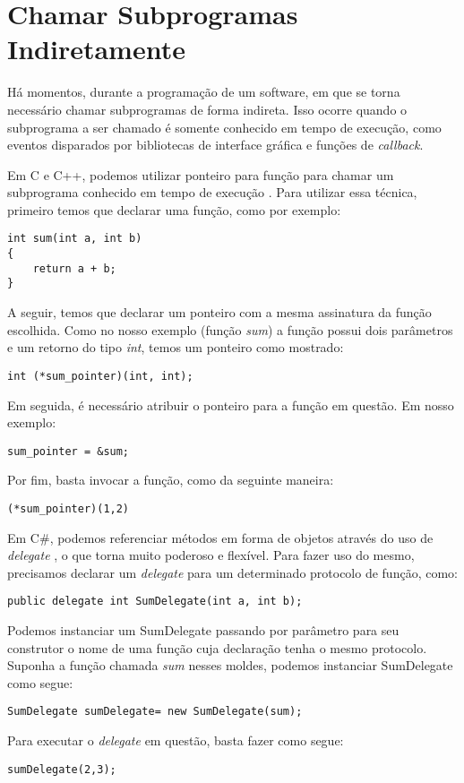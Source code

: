 \section{Chamar Subprogramas Indiretamente} %
\label{sec:chamar_subprogramas_indiretamente}
Há momentos, durante a programação de um software, em que se torna necessário chamar subprogramas de forma indireta. Isso ocorre quando o subprograma a ser chamado é somente conhecido em tempo de execução, como eventos disparados por bibliotecas de interface gráfica e funções de \textit{callback}.

Em C e C++, podemos utilizar ponteiro para função para chamar um subprograma conhecido em tempo de execução \cite{pointer,sebesta}. Para utilizar essa técnica, primeiro temos que declarar uma função, como por exemplo:
\begin{verbatim}
int sum(int a, int b)
{
    return a + b;
}
\end{verbatim}

A seguir, temos que declarar um ponteiro com a mesma assinatura da função escolhida. Como no nosso exemplo (função \textit{sum}) a função possui dois parâmetros e um retorno do tipo \emph{int}, temos um ponteiro como mostrado:
\begin{verbatim}
int (*sum_pointer)(int, int);
\end{verbatim}

Em seguida, é necessário atribuir o ponteiro para a função em questão. Em nosso exemplo:
\begin{verbatim}
sum_pointer = &sum;
\end{verbatim}

Por fim, basta invocar a função, como da seguinte maneira:
\begin{verbatim}
(*sum_pointer)(1,2)	
\end{verbatim}

Em C\#, podemos referenciar métodos em forma de objetos através do uso de \emph{delegate} \cite{delegate,sebesta}, o que torna muito poderoso e flexível. Para fazer uso do mesmo, precisamos declarar um \emph{delegate} para um determinado protocolo de função, como:
\begin{verbatim}
public delegate int SumDelegate(int a, int b);
\end{verbatim}

Podemos instanciar um SumDelegate passando por parâmetro para seu construtor o nome de uma função cuja declaração tenha o mesmo protocolo. Suponha a função chamada \textit{sum} nesses moldes, podemos instanciar SumDelegate como segue:
\begin{verbatim}
SumDelegate sumDelegate= new SumDelegate(sum);
\end{verbatim}

Para executar o \textit{delegate} em questão, basta fazer como segue:
\begin{verbatim}
sumDelegate(2,3);
\end{verbatim}
